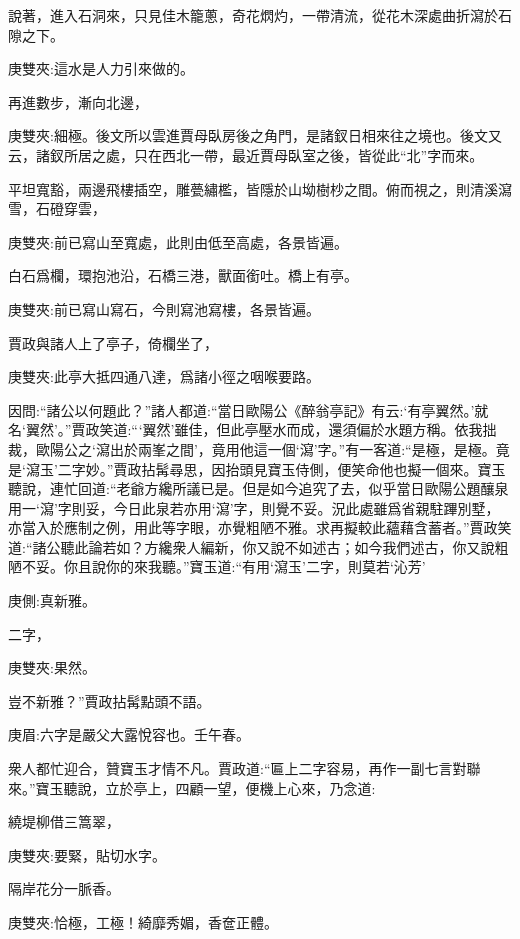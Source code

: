 \begin{parag}
    說著，進入石洞來，只見佳木籠蔥，奇花熌灼，一帶清流，從花木深處曲折瀉於石隙之下。 \begin{note}庚雙夾:這水是人力引來做的。\end{note} 再進數步，漸向北邊， \begin{note}庚雙夾:細極。後文所以雲進賈母臥房後之角門，是諸釵日相來往之境也。後文又云，諸釵所居之處，只在西北一帶，最近賈母臥室之後，皆從此“北”字而來。\end{note} 平坦寬豁，兩邊飛樓插空，雕甍繡檻，皆隱於山坳樹杪之間。俯而視之，則清溪瀉雪，石磴穿雲， \begin{note}庚雙夾:前已寫山至寬處，此則由低至高處，各景皆遍。\end{note} 白石爲欄，環抱池沿，石橋三港，獸面銜吐。橋上有亭。 \begin{note}庚雙夾:前已寫山寫石，今則寫池寫樓，各景皆遍。\end{note} 賈政與諸人上了亭子，倚欄坐了， \begin{note}庚雙夾:此亭大抵四通八達，爲諸小徑之咽喉要路。\end{note} 因問:“諸公以何題此？”諸人都道:“當日歐陽公《醉翁亭記》有云:‘有亭翼然。’就名‘翼然’。”賈政笑道:“‘翼然’雖佳，但此亭壓水而成，還須偏於水題方稱。依我拙裁，歐陽公之‘瀉出於兩峯之間’，竟用他這一個‘瀉’字。”有一客道:“是極，是極。竟是‘瀉玉’二字妙。”賈政拈髯尋思，因抬頭見寶玉侍側，便笑命他也擬一個來。寶玉聽說，連忙回道:“老爺方纔所議已是。但是如今追究了去，似乎當日歐陽公題釀泉用一‘瀉’字則妥，今日此泉若亦用‘瀉’字，則覺不妥。況此處雖爲省親駐蹕別墅，亦當入於應制之例，用此等字眼，亦覺粗陋不雅。求再擬較此蘊藉含蓄者。”賈政笑道:“諸公聽此論若如？方纔衆人編新，你又說不如述古；如今我們述古，你又說粗陋不妥。你且說你的來我聽。”寶玉道:“有用‘瀉玉’二字，則莫若‘沁芳’ \begin{note}庚側:真新雅。\end{note} 二字， \begin{note}庚雙夾:果然。\end{note} 豈不新雅？”賈政拈髯點頭不語。 \begin{note}庚眉:六字是嚴父大露悅容也。壬午春。\end{note} 衆人都忙迎合，贊寶玉才情不凡。賈政道:“匾上二字容易，再作一副七言對聯來。”寶玉聽說，立於亭上，四顧一望，便機上心來，乃念道:
\end{parag}


\begin{poem}
    \begin{pl}繞堤柳借三篙翠，\end{pl}
    \begin{note}庚雙夾:要緊，貼切水字。\end{note}

    \begin{pl}隔岸花分一脈香。\end{pl}
    \begin{note}庚雙夾:恰極，工極！綺靡秀媚，香奩正體。\end{note}
\end{poem}


